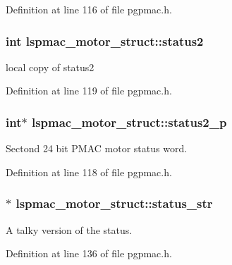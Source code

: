 Definition at line 116 of file pgpmac.\-h.

\hypertarget{structlspmac__motor__struct_a6a412224c09268c1dc92de9c2a1a2512}{
\subsubsection[{status2}]{\setlength{\rightskip}{0pt plus 5cm}int lspmac\-\_\-motor\-\_\-struct\-::status2}}\label{structlspmac__motor__struct_a6a412224c09268c1dc92de9c2a1a2512}


local copy of status2 



Definition at line 119 of file pgpmac.\-h.

\hypertarget{structlspmac__motor__struct_a2b33ef6e12717459c1e9967cc6e659c6}{
\subsubsection[{status2\-\_\-p}]{\setlength{\rightskip}{0pt plus 5cm}int$\ast$ lspmac\-\_\-motor\-\_\-struct\-::status2\-\_\-p}}\label{structlspmac__motor__struct_a2b33ef6e12717459c1e9967cc6e659c6}


Sectond 24 bit P\-M\-A\-C motor status word. 



Definition at line 118 of file pgpmac.\-h.

\hypertarget{structlspmac__motor__struct_aa0a6bed8379c5b1f90a4eb826cde9136}{
\subsubsection[{status\-\_\-str}]{$\ast$ lspmac\-\_\-motor\-\_\-struct\-::status\-\_\-str}}\label{structlspmac__motor__struct_aa0a6bed8379c5b1f90a4eb826cde9136}


A talky version of the status. 



Definition at line 136 of file pgpmac.\-h.

